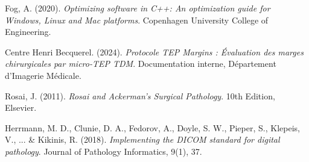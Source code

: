 \documentclass[12pt,a4paper]{report}
\begin{document}
\begin{thebibliography}{20}
Fog, A. (2020). 
\textit{Optimizing software in C++: An optimization guide for Windows, Linux and Mac platforms}. 
Copenhagen University College of Engineering.

Centre Henri Becquerel. (2024). 
\textit{Protocole TEP Margins : Évaluation des marges chirurgicales par micro-TEP TDM}. 
Documentation interne, Département d'Imagerie Médicale.

Rosai, J. (2011). 
\textit{Rosai and Ackerman's Surgical Pathology}. 
10th Edition, Elsevier.

Herrmann, M. D., Clunie, D. A., Fedorov, A., Doyle, S. W., Pieper, S., Klepeis, V., ... \& Kikinis, R. (2018). 
\textit{Implementing the DICOM standard for digital pathology}. 
Journal of Pathology Informatics, 9(1), 37.

\end{thebibliography}
\end{document}
